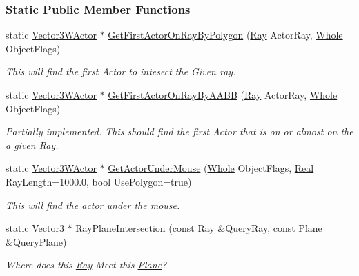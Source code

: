 \subsubsection*{Static Public Member Functions}
\begin{DoxyCompactItemize}
\item 
static \hyperlink{classphys_1_1Vector3WActor}{Vector3WActor} $\ast$ \hyperlink{classphys_1_1RayQueryTool_a89a45879ef765c569ca2b2f0a54f3dcd}{GetFirstActorOnRayByPolygon} (\hyperlink{classphys_1_1Ray}{Ray} ActorRay, \hyperlink{namespacephys_a460f6bc24c8dd347b05e0366ae34f34a}{Whole} ObjectFlags)
\begin{DoxyCompactList}\small\item\em This will find the first Actor to intesect the Given ray. \item\end{DoxyCompactList}\item 
static \hyperlink{classphys_1_1Vector3WActor}{Vector3WActor} $\ast$ \hyperlink{classphys_1_1RayQueryTool_af4bba2ed8f201d4b0e9a05728d8bd1b6}{GetFirstActorOnRayByAABB} (\hyperlink{classphys_1_1Ray}{Ray} ActorRay, \hyperlink{namespacephys_a460f6bc24c8dd347b05e0366ae34f34a}{Whole} ObjectFlags)
\begin{DoxyCompactList}\small\item\em Partially implemented. This should find the first Actor that is on or almost on the a given \hyperlink{classphys_1_1Ray}{Ray}. \item\end{DoxyCompactList}\item 
static \hyperlink{classphys_1_1Vector3WActor}{Vector3WActor} $\ast$ \hyperlink{classphys_1_1RayQueryTool_a15b961426b667f9b9cbec9dd0d72c2b1}{GetActorUnderMouse} (\hyperlink{namespacephys_a460f6bc24c8dd347b05e0366ae34f34a}{Whole} ObjectFlags, \hyperlink{namespacephys_af7eb897198d265b8e868f45240230d5f}{Real} RayLength=1000.0, bool UsePolygon=true)
\begin{DoxyCompactList}\small\item\em This will find the actor under the mouse. \item\end{DoxyCompactList}\item 
static \hyperlink{classphys_1_1Vector3}{Vector3} $\ast$ \hyperlink{classphys_1_1RayQueryTool_aa9daac724e8af535d1ec2b71f2ac5d83}{RayPlaneIntersection} (const \hyperlink{classphys_1_1Ray}{Ray} \&QueryRay, const \hyperlink{classphys_1_1Plane}{Plane} \&QueryPlane)
\begin{DoxyCompactList}\small\item\em Where does this \hyperlink{classphys_1_1Ray}{Ray} Meet this \hyperlink{classphys_1_1Plane}{Plane}? \item\end{DoxyCompactList}\item 

\end{DoxyCompactItemize}
